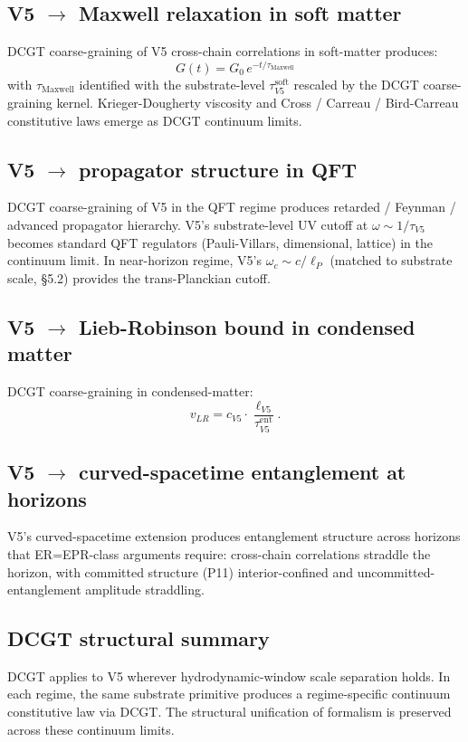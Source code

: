 \documentclass[11pt,a4paper]{article}
\begin{document}
\subsection{V5 $\to$ Maxwell relaxation in soft matter}

DCGT coarse-graining of V5 cross-chain correlations in soft-matter produces:
\[
G(t) = G_0\,e^{-t/\tau_\mathrm{Maxwell}}
\]
with $\tau_\mathrm{Maxwell}$ identified with the substrate-level $\tau_{V5}^\mathrm{soft}$ rescaled by the DCGT coarse-graining kernel. Krieger-Dougherty viscosity and Cross / Carreau / Bird-Carreau constitutive laws emerge as DCGT continuum limits.

\subsection{V5 $\to$ propagator structure in QFT}

DCGT coarse-graining of V5 in the QFT regime produces retarded / Feynman / advanced propagator hierarchy. V5's substrate-level UV cutoff at $\omega \sim 1/\tau_{V5}$ becomes standard QFT regulators (Pauli-Villars, dimensional, lattice) in the continuum limit. In near-horizon regime, V5's $\omega_c \sim c/\ell_P$ (matched to substrate scale, \S5.2) provides the trans-Planckian cutoff.

\subsection{V5 $\to$ Lieb-Robinson bound in condensed matter}

DCGT coarse-graining in condensed-matter:
\[
v_{LR} = c_{V5}\cdot\frac{\ell_{V5}}{\tau_{V5}^\mathrm{ent}}.
\]

\subsection{V5 $\to$ curved-spacetime entanglement at horizons}

V5's curved-spacetime extension produces entanglement structure across horizons that ER=EPR-class arguments require: cross-chain correlations straddle the horizon, with committed structure (P11) interior-confined and uncommitted-entanglement amplitude straddling.

\subsection{DCGT structural summary}

DCGT applies to V5 wherever hydrodynamic-window scale separation holds. In each regime, the same substrate primitive produces a regime-specific continuum constitutive law via DCGT. The structural unification of formalism is preserved across these continuum limits.
\end{document}
